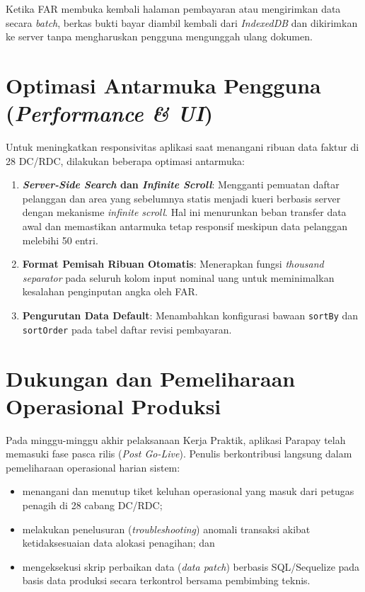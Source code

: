 Ketika FAR membuka kembali halaman pembayaran atau mengirimkan data secara \textit{batch}, berkas bukti bayar diambil kembali dari \textit{IndexedDB} dan dikirimkan ke server tanpa mengharuskan pengguna mengunggah ulang dokumen.

\section{Optimasi Antarmuka Pengguna (\textit{Performance \& UI})}
Untuk meningkatkan responsivitas aplikasi saat menangani ribuan data faktur di 28 DC/RDC, dilakukan beberapa optimasi antarmuka:
\begin{enumerate}[label=\arabic*)]
  \item \textbf{\textit{Server-Side Search} dan \textit{Infinite Scroll}}: Mengganti pemuatan daftar pelanggan dan area yang sebelumnya statis menjadi kueri berbasis server dengan mekanisme \textit{infinite scroll}. Hal ini menurunkan beban transfer data awal dan memastikan antarmuka tetap responsif meskipun data pelanggan melebihi 50 entri.
  \item \textbf{Format Pemisah Ribuan Otomatis}: Menerapkan fungsi \textit{thousand separator} pada seluruh kolom input nominal uang untuk meminimalkan kesalahan penginputan angka oleh FAR.
  \item \textbf{Pengurutan Data Default}: Menambahkan konfigurasi bawaan \texttt{sortBy} dan \texttt{sortOrder} pada tabel daftar revisi pembayaran.
\end{enumerate}

\section{Dukungan dan Pemeliharaan Operasional Produksi}
Pada minggu-minggu akhir pelaksanaan Kerja Praktik, aplikasi Parapay telah memasuki fase pasca rilis (\textit{Post Go-Live}). Penulis berkontribusi langsung dalam pemeliharaan operasional harian sistem:
\begin{itemize}
  \item menangani dan menutup tiket keluhan operasional yang masuk dari petugas penagih di 28 cabang DC/RDC;
  \item melakukan penelusuran (\textit{troubleshooting}) anomali transaksi akibat ketidaksesuaian data alokasi penagihan; dan
  \item mengeksekusi skrip perbaikan data (\textit{data patch}) berbasis SQL/Sequelize pada basis data produksi secara terkontrol bersama pembimbing teknis.
\end{itemize}

